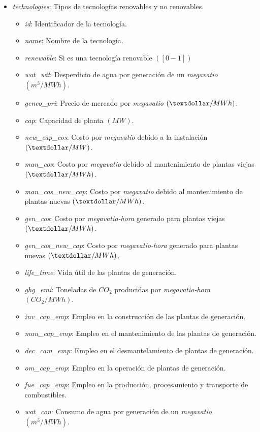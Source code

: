 \begin{itemize}
	\item \textit{technologies}: Tipos de tecnologías renovables y no renovables.
	\begin{itemize}
		\item \textit{id}: Identificador de la tecnología.		
		\item \textit{name}: Nombre de la tecnología.
		\item \textit{renewable}: Si es una tecnología renovable $ ([0 - 1]) $
		\item \textit{wat\_wit}: Desperdicio de agua por generación de un \textit{megavatio} $ (m^{3}/MWh) $.
		\item \textit{genco\_pri}: Precio de mercado por \textit{megavatio} $ (\textdollar/MWh) $.
		\item \textit{cap}: Capacidad de planta $ (MW) $.
		\item \textit{new\_cap\_cos}: Costo por \textit{megavatio} debido a la instalación $ (\textdollar/MW) $.
		\item \textit{man\_cos}: Costo por \textit{megavatio} debido al mantenimiento de plantas viejas $ (\textdollar/MWh) $.
		\item \textit{man\_cos\_new\_cap}: Costo por \textit{megavatio} debido al mantenimiento de plantas nuevas $ (\textdollar/MWh) $.
		\item \textit{gen\_cos}: Costo por \textit{megavatio-hora} generado para plantas viejas $ (\textdollar/MWh) $.
		\item \textit{gen\_cos\_new\_cap}: Costo por \textit{megavatio-hora} generado para plantas nuevas $ (\textdollar/MWh) $.
		\item \textit{life\_time}: Vida útil de las plantas de generación.
		\item \textit{ghg\_emi}: Toneladas de $CO_{2}$ producidas por \textit{megavatio-hora} $(CO_{2}/MWh)$.
		\item \textit{inv\_cap\_emp}: Empleo en la construcción de las plantas de generación.
		\item \textit{man\_cap\_emp}: Empleo en el mantenimiento de las plantas de generación.
		\item \textit{dec\_cam\_emp}: Empleo en el desmantelamiento de plantas de generación.
		\item \textit{om\_cap\_emp}: Empleo en la operación de plantas de generación.
		\item \textit{fue\_cap\_emp}: Empleo en la producción, procesamiento y transporte de combustibles.
		\item \textit{wat\_con}: Consumo de agua por generación de un \textit{megavatio} $ (m^{3}/MWh) $.
	\end{itemize}


\end{itemize}
